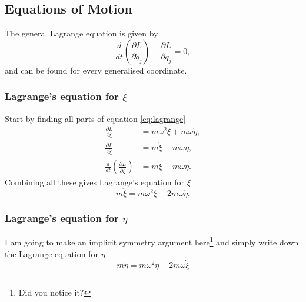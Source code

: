 \documentclass[11pt]{amsart}
\begin{document}
\subsection{Equations of Motion} The general Lagrange equation is given by
\begin{equation}
\label{eq:lagrange}
\frac{d}{dt}\left(\frac{\partial L}{\partial\dot{q}_j} \right) - \frac{\partial L}{\partial q_j} = 0,
\end{equation}
and can be found for every generalised coordinate.
\subsubsection{Lagrange's equation for $\xi$}
Start by finding all parts of equation \ref{eq:lagrange}
\begin{align*}
\frac{\partial L}{\partial \xi} &= m\omega^2\xi + m\omega\dot{\eta}, \\
\frac{\partial L}{\partial \dot{\xi}} &= m\dot{\xi}-m\omega\eta, \\
\frac{d}{dt}\left(\frac{\partial L}{\partial\dot{\xi}} \right) &= m\ddot{\xi}-m\omega\dot{\eta}.
\end{align*}
Combining all these gives Lagrange's equation for $\xi$
\begin{equation}
\label{eq:lagrangexi}
m\ddot{\xi} = m\omega^2\xi + 2m\omega\dot{\eta}.
\end{equation}

\subsubsection{Lagrange's equation for $\eta$}
I am going to make an implicit symmetry argument here\footnote{Did you notice it?} and simply write down the Lagrange equation for $\eta$
\begin{equation}
\label{eq:lagrangeeta}
m\ddot{\eta} = m\omega^2\eta - 2m\omega\dot{\xi}
\end{equation} 
\end{document}
